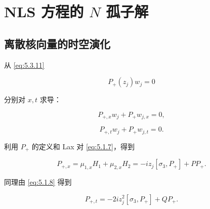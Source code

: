 \documentclass[
    lang=cn,
    scheme=chinese,
    mode=simple,
    device=normal,
    color=blue,
    math=cm,
    thmcnt=section,
    12pt,
    nowatermark
]{elegantbook}
\begin{document}


\section{NLS 方程的 \texorpdfstring{$N$}{N} 孤子解}

\subsection{离散核向量的时空演化}

从 \eqref{eq:5.3.11}

\[
    P_+(z_j)w_j=0
\]

分别对 $x,t$ 求导：

\begin{equation}
    P_{+,x}w_j+P_+w_{j,x}=0,
    \tag{5.4.1}
    \label{eq:5.4.1}
\end{equation}

\begin{equation}
    P_{+,t}w_j+P_+w_{j,t}=0.
    \tag{5.4.2}
    \label{eq:5.4.2}
\end{equation}

利用 $P_+$ 的定义和 Lax 对 \eqref{eq:5.1.7}，得到

\begin{equation}
    P_{+,x}
    =
    \mu_{1,x}H_1+\mu_{2,x}H_2
    =
    -iz_j[\sigma_3,P_+]+PP_+.
    \tag{5.4.3}
    \label{eq:5.4.3}
\end{equation}

同理由 \eqref{eq:5.1.8} 得到

\begin{equation}
    P_{+,t}
    =
    -2iz_j^2[\sigma_3,P_+]+QP_+.
    \tag{5.4.4}
    \label{eq:5.4.4}
\end{equation}
\end{document}
